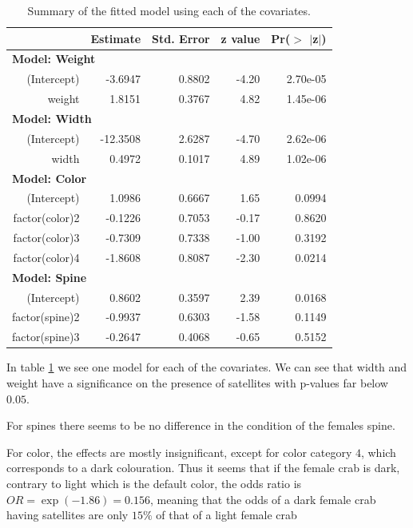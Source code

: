 \documentclass[a4paper,norsk, 10pt]{article}
\begin{document}
\begin{table}[!htb]
\centering
\begin{tabular}{rrrrr}
  \hline
 & Estimate & Std. Error & z value & Pr($>$ $|$z$|$) \\ 
  \hline
  \multicolumn{5}{l}{\textbf{Model: Weight}}\\
(Intercept) & -3.6947 & 0.8802 & -4.20 & 2.70e-05 \\ 
  weight & 1.8151 & 0.3767 & 4.82 & 1.45e-06 \\ 
   \hline
   \multicolumn{5}{l}{\textbf{Model: Width}}\\
   (Intercept) & -12.3508 & 2.6287 & -4.70 & 2.62e-06 \\ 
  width & 0.4972 & 0.1017 & 4.89 & 1.02e-06 \\ 
   \hline
   \multicolumn{5}{l}{\textbf{Model: Color}}\\
   (Intercept) & 1.0986 & 0.6667 & 1.65 & 0.0994 \\ 
  factor(color)2 & -0.1226 & 0.7053 & -0.17 & 0.8620 \\ 
  factor(color)3 & -0.7309 & 0.7338 & -1.00 & 0.3192 \\ 
  factor(color)4 & -1.8608 & 0.8087 & -2.30 & 0.0214 \\ 
   \hline
   \multicolumn{5}{l}{\textbf{Model: Spine}}\\
   (Intercept) & 0.8602 & 0.3597 & 2.39 & 0.0168 \\ 
  factor(spine)2 & -0.9937 & 0.6303 & -1.58 & 0.1149 \\ 
  factor(spine)3 & -0.2647 & 0.4068 & -0.65 & 0.5152 \\ 
   \hline
\end{tabular}
\caption{Summary of the fitted model using each of the covariates.}
\label{tab:crabs_each}
\end{table}

In table \ref{tab:crabs_each} we see one model for each of the covariates. We can see that width and weight have a significance on the presence of satellites with p-values far below $0.05$. 

For spines there seems to be no difference in the condition of the females spine. 

For color, the effects are mostly insignificant, except for color category $4$, which corresponds to a dark colouration. Thus it seems that if the female crab is dark, contrary to light which is the default color, the odds ratio is $OR = \exp(-1.86) = 0.156$, meaning that the odds of a dark female crab having satellites are only $15\%$ of that of a light female crab 
\end{document}

